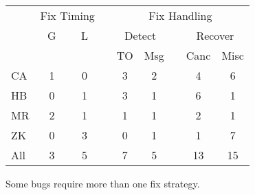 

\begin{table}[t]
\small
\centering
\begin{tabular}{lcccccccc}
\toprule
   & \multicolumn{2}{c}{Fix Timing} && \multicolumn{5}{c}{Fix Handling}\\
\cmidrule{2-3}
\cmidrule{5-9}
   &  G & L &&
   \multicolumn{2}{c}{Detect} &&
   \multicolumn{2}{c}{Recover}\\
\cmidrule{5-6}
\cmidrule{8-9}
   &&&&
   TO & Msg & &
   Canc & Misc \\
\midrule
CA & 1   & 0 && 3 & 2 && 4 & 6   \\
HB & 0   & 1 && 3 & 1 && 6 & 1   \\
MR & 2   & 1 && 1 & 1 && 2 & 1   \\
ZK & 0   & 3 && 0 & 1 && 1 & 7   \\
\midrule
All& 3   & 5 && 7 & 5 && 13& 15  \\
\bottomrule
\end{tabular}
 {Some bugs require more than one fix
strategy.}
\end{table}
